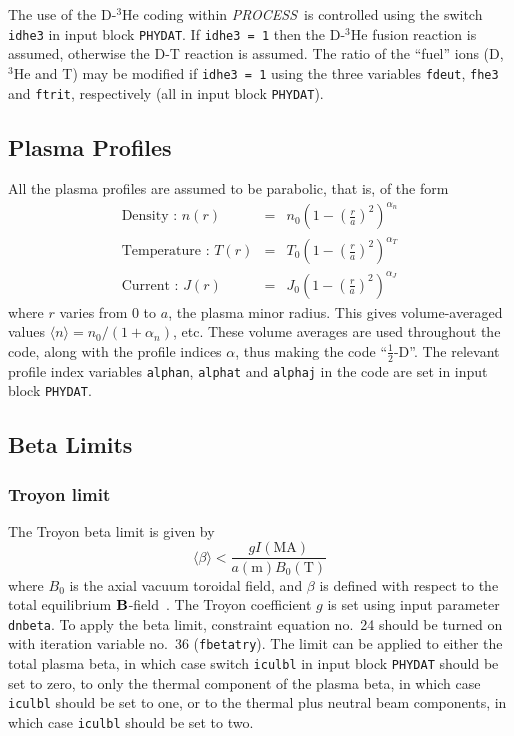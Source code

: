 \documentclass[11pt,a4paper]{report}
\newcommand{\PS}{\mbox{\it PROCESS\/ }}
\begin{document}
The use of the D-$^3$He coding within \PS is controlled using the switch
\texttt{idhe3} in input block \texttt{PHYDAT}. If \texttt{idhe3 = 1} then the
D-$^3$He fusion reaction is assumed, otherwise the D-T reaction is
assumed. The ratio of the ``fuel'' ions (D, $^3$He and T) may be modified if
\texttt{idhe3 = 1} using the three variables \texttt{fdeut}, \texttt{fhe3} and
\texttt{ftrit}, respectively (all in input block \texttt{PHYDAT}).

\subsection{Plasma Profiles}
\setlength{\parskip}{0mm}
All the plasma profiles are assumed to be parabolic, that is, of the form
\begin{eqnarray}
\mbox{Density : } n(r) & = & n_0 \left( 1- \left(\frac{r}{a}\right)^2 \right)
^{\alpha_n} \\
\mbox{Temperature : } T(r) & = & T_0 \left( 1- \left(\frac{r}{a}\right)^2
\right) ^{\alpha_T} \\
\mbox{Current : } J(r) & = & J_0 \left( 1- \left(\frac{r}{a}\right)^2  \right)
^{\alpha_J}
\end{eqnarray}
where $r$ varies from 0 to $a$, the plasma minor radius. This gives
volume-averaged values $\langle n \rangle = n_0 / (1+\alpha_n)$, etc.  These
volume averages are used throughout the code, along with the profile indices
$\alpha$, thus making the code ``$\frac{1}{2}$-D''.  The relevant profile
index variables {\tt alphan}, {\tt alphat} and {\tt alphaj} in the code are
set in input block {\tt PHYDAT}.

\subsection{Beta Limits}

\subsubsection{Troyon limit \protect\cite{IPDG,172}}

The Troyon beta limit is given by
\begin{equation}
\langle \beta \rangle < \frac{gI(\mbox{MA})}{a(\mbox{m})B_0(\mbox{T})}
\label{eq:troyon}
\end{equation}
where $B_0$ is the axial vacuum toroidal field, and $\beta$ is defined with
respect to the total equilibrium ${\bf B}$-field~\cite{172}. The Troyon
coefficient $g$ is set using input parameter {\tt dnbeta}. To apply the beta
limit, constraint equation no.\ 24 should be turned on with iteration variable
no.\ 36 ({\tt fbetatry}). The limit can be applied to either the total plasma
beta, in which case switch {\tt iculbl} in input block {\tt PHYDAT} should be
set to zero, to only the thermal component of the plasma beta, in which
case {\tt iculbl} should be set to one, or to the thermal plus neutral beam
components, in which case {\tt iculbl} should be set to two.
\end{document}
